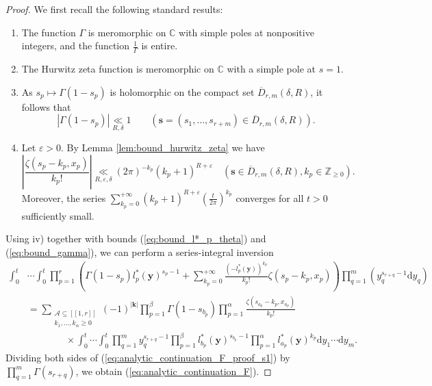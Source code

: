 \documentclass[a4paper]{amsart}
\theoremstyle{remark}
\theoremstyle{definition}
\newcommand{\dd}{\mathrm{d}}
\begin{document}
\begin{proof}
We first recall the following standard results:
\begin{enumerate}
	\item[i)] The function $\Gamma$ is meromorphic on $\mathbb{C}$ with simple poles at nonpositive integers, and the function $\frac{1}{\Gamma}$ is entire.
	\item[ii)] The Hurwitz zeta function is meromorphic on $\mathbb{C}$ with a simple pole at $s=1$.
	\item[iii)] As $s_p \mapsto \Gamma(1-s_p)$ is holomorphic on the compact set $\overline{D}_{r,m}(\delta,R)$, it follows that
\begin{equation}
    |\Gamma(1-s_p)| \underset{R,\delta}{\ll} 1 \qquad (\mathbf{s}=(s_1,\ldots,s_{r+m}) \in \overline{D}_{r,m}(\delta,R)). \label{eq:bound_gamma}
\end{equation}
	\item[iv)] Let $\varepsilon>0$. By Lemma \ref{lem:bound_hurwitz_zeta} we have
\begin{equation}
    \left|\frac{\zeta(s_p-k_p,x_p)}{k_p!}\right| \underset{R,\varepsilon,\delta}{\ll} (2\pi)^{-k_p}(k_p+1)^{R+\varepsilon} \quad (\mathbf{s} \in \overline{D}_{r,m}(\delta,R),k_p \in \mathbb{Z}_{\geq 0}). \label{eq:bound_zeta}
\end{equation}
	Moreover, the series $\sum_{k_p=0}^{+\infty} (k_p+1)^{R+\varepsilon}\left(\frac{t}{2\pi}\right)^{k_p}$ converges for all $t>0$ sufficiently small.
\end{enumerate}

Using iv) together with bounds (\ref{eq:bound_l*_p_theta}) and (\ref{eq:bound_gamma}), we can perform a series-integral inversion
\begin{align}
    \int_{0}^{t}& \cdots \int_{0}^{t} \prod_{p=1}^r \left(\Gamma(1-s_p) l_p^*(\mathbf{y})^{s_p-1} + \sum_{k_p=0}^{+\infty} \frac{(-l_p^*(\mathbf{y}))^{k_p}}{k_p!} \zeta(s_p-k_p,x_p) \right) \prod_{q=1}^{m}\left( y_q^{s_{r+q}-1} \dd y_q \right) \nonumber \\
    &= \sum_{\substack{\mathcal{A} \subseteq [\![1,r]\!] \\ k_1,\ldots,k_{\alpha}\geq 0}} (-1)^{|\mathbf{k}|} \prod_{p=1}^{\beta} \Gamma(1-s_{b_p}) \prod_{p=1}^{\alpha} \frac{\zeta(s_{a_p}-k_p,x_{a_p})}{k_p!} \label{eq:analytic_continuation_F_proof_s1}\\
    & \qquad \qquad \times \int_0^t \cdots \int_0^t \prod_{q=1}^{m} y_q^{s_{r+q}-1}\prod_{p=1}^{\beta} l^*_{b_p}(\mathbf{y})^{s_{b_p}-1} \prod_{p=1}^{\alpha} l^*_{a_p}(\mathbf{y})^{k_p} \dd y_1 \cdots \dd y_{m}. \nonumber
\end{align}
Dividing both sides of (\ref{eq:analytic_continuation_F_proof_s1}) by $\prod_{q=1}^{m}\Gamma(s_{r+q})$, we obtain (\ref{eq:analytic_continuation_F}).
\end{proof}
\end{document}
